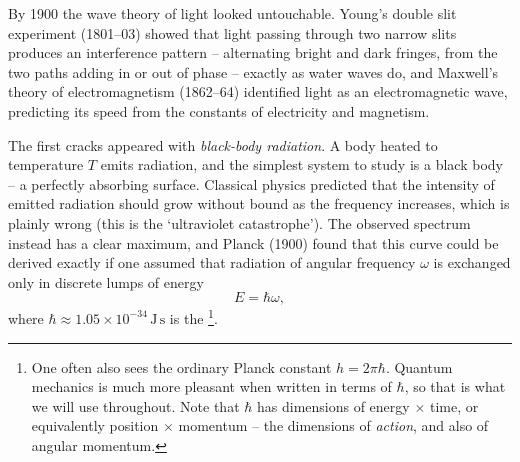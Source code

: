 By 1900 the wave theory of light looked untouchable. Young's double slit experiment (1801--03) showed that light passing through two narrow slits produces an interference pattern -- alternating bright and dark fringes, from the two paths adding in or out of phase -- exactly as water waves do, and Maxwell's theory of electromagnetism (1862--64) identified light as an electromagnetic wave, predicting its speed from the constants of electricity and magnetism.

\begin{center}
\end{center}

The first cracks appeared with \emph{black-body radiation}. A body heated to temperature $T$ emits radiation, and the simplest system to study is a black body -- a perfectly absorbing surface. Classical physics predicted that the intensity of emitted radiation should grow without bound as the frequency increases, which is plainly wrong (this is the `ultraviolet catastrophe'). The observed spectrum instead has a clear maximum, and Planck (1900) found that this curve could be derived exactly if one assumed that radiation of angular frequency $\omega$ is exchanged only in discrete lumps of energy
$$
E = \hbar \omega,
$$
where $\hbar \approx 1.05 \times 10^{-34} \, \mathrm{J \, s}$ is the \footnote{One often also sees the ordinary Planck constant $h = 2 \pi \hbar$. Quantum mechanics is much more pleasant when written in terms of $\hbar$, so that is what we will use throughout. Note that $\hbar$ has dimensions of energy $\times$ time, or equivalently position $\times$ momentum -- the dimensions of \emph{action}, and also of angular momentum.}.

